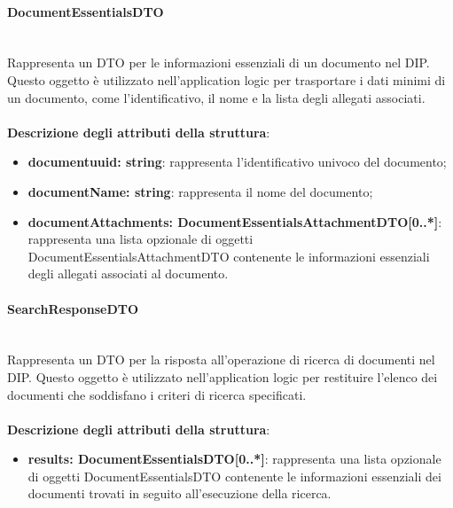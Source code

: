 \documentclass[a4paper,12pt]{article}
\begin{document}
{{{                \paragraph{DocumentEssentialsDTO}\label{par:DocumentEssentialsDTO}\mbox{}\\
                Rappresenta un DTO per le informazioni essenziali di un documento nel DIP. Questo oggetto è utilizzato nell'application logic per trasportare i dati minimi di un documento, come l'identificativo, il nome e la lista degli allegati associati.\\
                \\
                \textbf{Descrizione degli attributi della struttura}:
                \begin{itemize}
                    \item \textbf{documentuuid: string}: rappresenta l'identificativo univoco del documento;
                    \item \textbf{documentName: string}: rappresenta il nome del documento;
                    \item \textbf{documentAttachments: DocumentEssentialsAttachmentDTO[0..*]}: rappresenta una lista opzionale di oggetti DocumentEssentialsAttachmentDTO contenente le informazioni essenziali degli allegati associati al documento.
                \end{itemize}

                \paragraph{SearchResponseDTO}\label{par:SearchResponseDTO}\mbox{}\\
                Rappresenta un DTO per la risposta all'operazione di ricerca di documenti nel DIP. Questo oggetto è utilizzato nell'application logic per restituire l'elenco dei documenti che soddisfano i criteri di ricerca specificati.\\
                \\
                \textbf{Descrizione degli attributi della struttura}:
                \begin{itemize}
                    \item \textbf{results: DocumentEssentialsDTO[0..*]}: rappresenta una lista opzionale di oggetti DocumentEssentialsDTO contenente le informazioni essenziali dei documenti trovati in seguito all'esecuzione della ricerca.
                \end{itemize}

}}}
\end{document}
